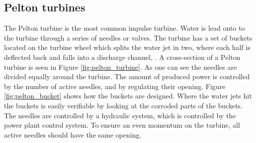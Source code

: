     
    
    \subsection{Pelton turbines}\label{subsec:pelton}
        
        The Pelton turbine is the most common impulse turbine. Water is lead onto to the turbine through a series of needles or valves. The turbine has a set of buckets located on the turbine wheel which splits the water jet in two, where each half is deflected back and falls into a discharge channel, \cite{Paish2002}. A cross-section of a Pelton turbine is seen in Figure \ref{fig:pelton_turbine}. As one can see the needles are divided equally around the turbine. The amount of produced power is controlled by the number of active needles, and by regulating their opening. Figure \ref{fig:pelton_bucket} shows how the buckets are designed. Where the water jets hit the buckets is easily verifiable by looking at the corroded parts of the buckets. The needles are controlled by a hydraulic system, which is controlled by the power plant control system. To ensure an even momentum on the turbine, all active needles should have the same opening. 
        

